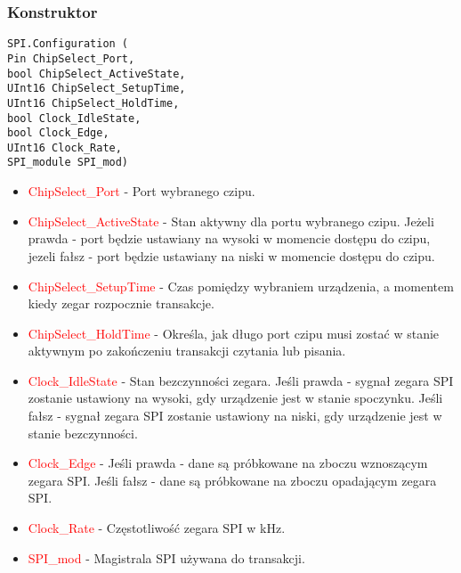 \documentclass{article}
\begin{document}
\subsubsection{Konstruktor}
\begin{lstlisting}[frame=single]
SPI.Configuration (
Pin ChipSelect_Port, 
bool ChipSelect_ActiveState,
UInt16 ChipSelect_SetupTime, 
UInt16 ChipSelect_HoldTime,  
bool Clock_IdleState, 
bool Clock_Edge, 
UInt16 Clock_Rate, 
SPI_module SPI_mod)
\end{lstlisting}
\begin{itemize}
\item \textcolor{red}{ChipSelect\_Port} - Port wybranego czipu.
\item \textcolor{red}{ChipSelect\_ActiveState} - Stan aktywny dla portu wybranego czipu. Jeżeli prawda - port będzie ustawiany na wysoki w momencie dostępu do czipu, jezeli fałsz - port będzie ustawiany na niski w momencie dostępu do czipu.
\item \textcolor{red}{ChipSelect\_SetupTime} - Czas pomiędzy wybraniem urządzenia, a momentem kiedy zegar rozpocznie transakcje. 
\item \textcolor{red}{ChipSelect\_HoldTime} - Określa, jak długo port czipu musi zostać w stanie aktywnym po zakończeniu transakcji czytania lub pisania.
\item \textcolor{red}{Clock\_IdleState} - Stan bezczynności zegara. Jeśli prawda - sygnał zegara SPI zostanie ustawiony na wysoki, gdy urządzenie jest w stanie spoczynku. Jeśli fałsz - sygnał zegara SPI zostanie ustawiony na niski, gdy urządzenie jest w stanie bezczynności. 
\item \textcolor{red}{Clock\_Edge} - Jeśli prawda - dane są próbkowane na zboczu wznoszącym zegara SPI. Jeśli fałsz - dane są próbkowane na zboczu opadającym zegara SPI.
\item \textcolor{red}{Clock\_Rate} - Częstotliwość zegara SPI w kHz.
\item \textcolor{red}{SPI\_mod} - Magistrala SPI używana do transakcji.
\end{itemize}
\newpage
\end{document}
